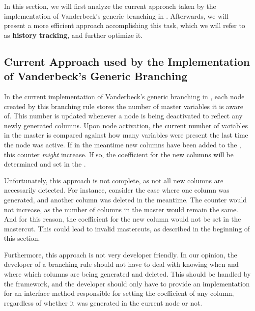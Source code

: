 In this section, we will first analyze the current approach taken by the implementation of Vanderbeck's generic branching in \GCG{}. Afterwards, we will present a more efficient approach accomplishing this task, which we will refer to as \textbf{history tracking}, and further optimize it.

\subsection{Current Approach used by the Implementation of Vanderbeck's Generic Branching}\label{subsec:gm_sync_current}
In the current implementation of Vanderbeck's generic branching in \GCG{}, each node created by this branching rule stores the number of master variables it is aware of. This number is updated whenever a node is being deactivated to reflect any newly generated columns. Upon node activation, the current number of variables in the master is compared against how many variables were present the last time the node was active. If in the meantime new columns have been added to the \RMP{}, this counter \textit{might} increase. If so, the coefficient for the new columns will be determined and set in the \RMP{}.

Unfortunately, this approach is not complete, as not all new columns are necessarily detected. For instance, consider the case where one column was generated, and another column was deleted in the meantime. The counter would not increase, as the number of columns in the master would remain the same. And for this reason, the coefficient for the new column would not be set in the mastercut. This could lead to invalid mastercuts, as described in the beginning of this section.

Furthermore, this approach is not very developer friendly. In our opinion, the developer of a branching rule should not have to deal with knowing when and where which columns are being generated and deleted. This should be handled by the framework, and the developer should only have to provide an implementation for an interface method responsible for setting the coefficient of any column, regardless of whether it was generated in the current node or not.

